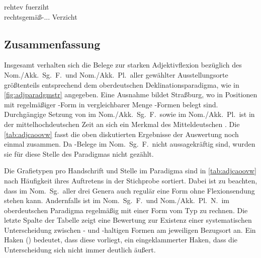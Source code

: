 \begin{exe}
\ex \label{ex:adjwienakksgf_4}
	\gll rehtev	fuerziht \\
		rechtsgemäß-\Acc.\Sg.\FemI.\St{} Verzicht \\
	\begin{taggedline}{\parencites(Wien, 1296)[\pno~2424, 500.7]{cao3}}
	\trans {}
	\end{taggedline}
\end{exe}

\subsection{Zusammenfassung}

Insgesamt verhalten sich die Belege zur starken Adjektivflexion bezüglich des
Nom./\allowbreak{}Akk.\ Sg.~F.\ und Nom./Akk.\ Pl.\ aller gewählter
Ausstellungs\-orte größtenteils entsprechend dem oberdeutschen
Deklinationsparadigma, wie in \cref{fig:adjparadgmstr} angegeben. Eine Ausnahme
bildet Straßburg, wo in Positionen mit regelmäßiger -Form in
vergleichbarer Menge -Formen belegt sind. Durchgängige Setzung von
 im Nom./Akk.\ Sg.~F.\ sowie im Nom./Akk.\ Pl.\ ist in der
mittelhochdeutschen Zeit an sich ein Merkmal des Mitteldeutschen
\autocites[181]{ksw2}[vgl.~auch][832]{wiesinger1983}. Die
\cref{tab:adjcaoovw} fasst die oben diskutierten Ergebnisse der Auswertung noch
einmal zusammen. Da -Belege im Nom.\ Sg.~F.\ nicht aussagekräftig
sind, wurden sie für diese Stelle des Paradigmas nicht gezählt.

Die Grafietypen pro Handschrift und Stelle im Paradigma sind in
\cref{tab:adjcaoovw} nach Häufigkeit ihres Auftretens in der Stichprobe
sortiert. Dabei ist zu beachten, dass im Nom.\ Sg.\ aller drei Genera auch
regulär eine Form ohne Flexionsendung stehen kann. Andernfalls ist im Nom.\
Sg.~F.\ und Nom./Akk.\ Pl.~N.\ im oberdeutschen Paradigma regelmäßig mit einer
Form vom Typ \norm{-iu} zu rechnen.
Die letzte Spalte der Tabelle zeigt eine Bewertung zur Existenz einer
systematischen Unterscheidung zwischen \norm{e}- und \norm{iu}-haltigen Formen
am jeweiligen Bezugsort an. Ein Haken (\chk) bedeutet, dass diese vorliegt, ein
eingeklammerter Haken, dass die Unterscheidung sich nicht immer deutlich
äußert.

